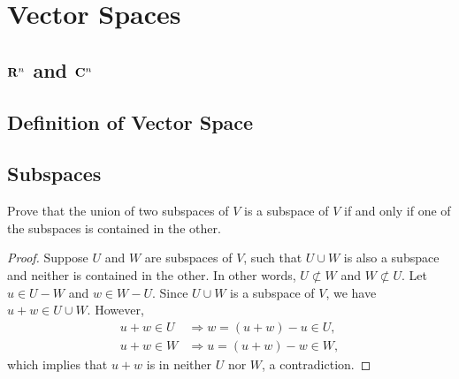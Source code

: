 \chapter{Vector Spaces}

\section{\texorpdfstring{$\mathbf{R}^{n}$}{R\^{}n} and \texorpdfstring{$\mathbf{C}^{n}$}{C\^{}n}}

\section{Definition of Vector Space}

\section{Subspaces}

\begin{exercise}{12}
	Prove that the union of two subspaces of \( V \) is a subspace of \( V \) if
	and only if one of the subspaces is contained in the other.
\end{exercise}

\begin{proof}
	Suppose \( U \) and \( W \) are subspaces of \( V \), such that \( U \cup W \)
	is also a subspace and neither is contained in the other.
	In other words, \( U \not\subset W \) and \( W \not\subset U \).
	Let \( u \in U - W \) and \( w \in W - U \).
	Since \( U \cup W \) is a subspace of \( V \), we have \( u + w \in U \cup W \).
	However,
	\begin{align*}
		u + w \in U &\Rightarrow w = (u + w) - u \in U, \\
		u + w \in W &\Rightarrow u = (u + w) - w \in W,
	\end{align*}
	which implies that \( u + w \) is in neither \( U \) nor \( W \), a contradiction.
\end{proof}
